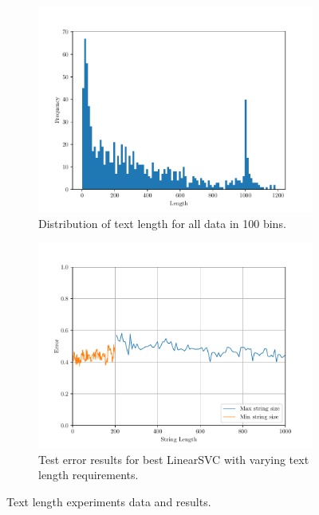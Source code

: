 \begin{figure}[ht]
    \centering
    \begin{subfigure}{0.49\textwidth}
        \includegraphics[width=\textwidth]{../img/plot_string_length_dist_all_data}
        \caption{Distribution of text length for all data in 100 bins.}
        \label{fig:string_length_dist}
    \end{subfigure}
    \hfill
    \begin{subfigure}{0.49\textwidth}
        \includegraphics[width=\textwidth]{../img/plot_data_length_grid_search}
        \caption{Test error results for best LinearSVC with varying text length requirements.}
        \label{fig:grid_search_text_length}
    \end{subfigure}
    \caption{Text length experiments data and results.}
\end{figure}

